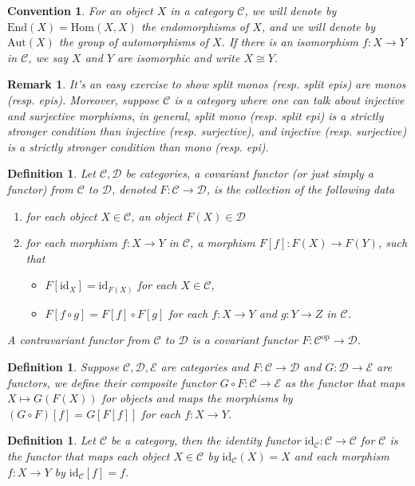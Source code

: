 \documentclass[10pt]{book}
\theoremstyle{bookplain}
\theoremstyle{bookdefinition}
\newtheorem{definition}[theorem]{Definition}
\theoremstyle{bookremark}
\newtheorem{remark}[theorem]{Remark}
\newtheorem{convention}[theorem]{Convention}
\begin{document}
\begin{convention}For an object $X$ in a category $\mathscr{C}$, we will denote by $\mathrm{End}(X)=\mathrm{Hom}(X,X)$ the endomorphisms of $X$, and we will denote by $\mathrm{Aut}(X)$ the group of automorphisms of $X$. If there is an isomorphism $f:X\rightarrow Y$ in $\mathscr{C}$, we say $X$ and $Y$ are isomorphic and write $X\cong Y$. 
\end{convention}
\begin{remark}It's an easy exercise to show split monos (resp. split epis) are monos (resp. epis).
    Moreover, suppose $\mathscr{C}$ is a category where one can talk about injective and surjective morphisms, in general, split mono (resp. split epi) is a strictly stronger condition than injective (resp. surjective), and injective (resp. surjective) is a strictly stronger condition than mono (resp. epi). 
\end{remark}


\begin{definition}
    Let $\mathscr{C}, \mathscr{D}$ be categories, a \textit{covariant functor} (or just simply a \textit{functor}) from $\mathscr{C}$ to $\mathscr{D}$, denoted $F:\mathscr{C}\rightarrow \mathscr{D}$, is the collection of the following data
    \begin{enumerate}
        \item for each object $X\in\mathscr{C}$, an object $F(X)\in \mathscr{D}$
        \item for each morphism $f:X\rightarrow Y$ in $\mathscr{C}$, a morphism $F[f]:F(X)\rightarrow F(Y)$, such that 
        \begin{itemize}
            \item $F[\mathrm{id}_X]=\mathrm{id}_{F(X)}$ for each $X\in\mathscr{C}$,
            \item $F[f\circ g]=F[f]\circ F[g]$ for each $f:X\rightarrow Y$ and $g:Y\rightarrow Z$ in $\mathscr{C}$.
        \end{itemize}
    \end{enumerate}
     A \textit{contravariant functor} from $\mathscr{C}$ to $\mathscr{D}$ is a covariant functor $F:\mathscr{C}^{\mathrm{op}}\rightarrow\mathscr{D}$. 
\end{definition}
\begin{definition}Suppose $\mathscr{C}, \mathscr{D}, \mathscr{E}$ are categories and $F:\mathscr{C}\rightarrow \mathscr{D}$ and $G:\mathscr{D}\rightarrow \mathscr{E}$ are functors, we define their \textit{composite functor} $G\circ F:\mathscr{C}\rightarrow\mathscr{E}$ as the functor that maps $X\mapsto G(F(X))$ for objects and maps the morphisms by $(G\circ F)[f]=G[F[f]]$ for each $f:X\rightarrow Y$. 
\end{definition}
\begin{definition}Let $\mathscr{C}$ be a category, then the \textit{identity functor} $\mathrm{id}_{\mathscr{C}}:\mathscr{C}\rightarrow \mathscr{C}$ for $\mathscr{C}$ is the functor that maps each object $X\in\mathscr{C}$ by $\mathrm{id}_{\mathscr{C}}(X)=X$ and each morphism $f:X\rightarrow Y$ by $\mathrm{id}_{\mathscr{C}}[f]=f$. 
\end{definition}
\end{document}
